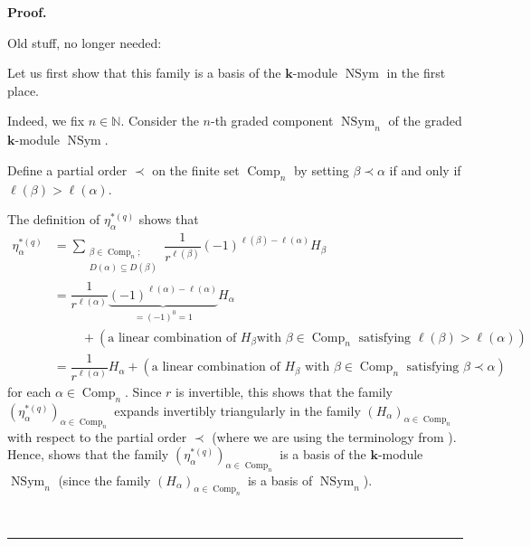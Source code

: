 \documentclass[numbers=enddot,12pt,final,onecolumn,notitlepage]{scrartcl}%
\theoremstyle{definition}
\newenvironment{proof}[1][Proof]{\noindent\textbf{#1.} }{\ \rule{0.5em}{0.5em}}
\let\sumnonlimits\sum
\renewcommand{\sum}{\sumnonlimits\limits}
\newenvironment{verlong}{}{}
\newenvironment{noncompile}{}{}
\begin{document}
\begin{proof}
\begin{verlong}
\end{verlong}

\begin{noncompile}
Old stuff, no longer needed:

Let us first show that this family is a basis of the $\mathbf{k}$-module
$\operatorname*{NSym}$ in the first place.

Indeed, we fix $n\in\mathbb{N}$. Consider the $n$-th graded component
$\operatorname*{NSym}\nolimits_{n}$ of the graded $\mathbf{k}$-module
$\operatorname*{NSym}$.

Define a partial order $\prec$ on the finite set $\operatorname*{Comp}%
\nolimits_{n}$ by setting $\beta\prec\alpha$ if and only if $\ell\left(
\beta\right)  >\ell\left(  \alpha\right)  $.

The definition of $\eta_{\alpha}^{\ast\left(  q\right)  }$ shows that%
\begin{align*}
\eta_{\alpha}^{\ast\left(  q\right)  }  &  =\sum_{\substack{\beta
\in\operatorname*{Comp}\nolimits_{n};\\D\left(  \alpha\right)  \subseteq
D\left(  \beta\right)  }}\dfrac{1}{r^{\ell\left(  \beta\right)  }}\left(
-1\right)  ^{\ell\left(  \beta\right)  -\ell\left(  \alpha\right)  }H_{\beta
}\\
&  =\dfrac{1}{r^{\ell\left(  \alpha\right)  }}\underbrace{\left(  -1\right)
^{\ell\left(  \alpha\right)  -\ell\left(  \alpha\right)  }}_{=\left(
-1\right)  ^{0}=1}H_{\alpha}\\
&  \ \ \ \ \ \ \ \ \ \ +\left(  \text{a linear combination of }H_{\beta}\text{
with }\beta\in\operatorname*{Comp}\nolimits_{n}\text{ satisfying }\ell\left(
\beta\right)  >\ell\left(  \alpha\right)  \right) \\
&  =\dfrac{1}{r^{\ell\left(  \alpha\right)  }}H_{\alpha}+\left(  \text{a
linear combination of }H_{\beta}\text{ with }\beta\in\operatorname*{Comp}%
\nolimits_{n}\text{ satisfying }\beta\prec\alpha\right)
\end{align*}
for each $\alpha\in\operatorname*{Comp}\nolimits_{n}$. Since $r$ is
invertible, this shows that the family $\left(  \eta_{\alpha}^{\ast\left(
q\right)  }\right)  _{\alpha\in\operatorname*{Comp}\nolimits_{n}}$ expands
invertibly triangularly in the family $\left(  H_{\alpha}\right)  _{\alpha
\in\operatorname*{Comp}\nolimits_{n}}$ with respect to the partial order
$\prec$ (where we are using the terminology from \cite[\S 11.1]{GriRei}).
Hence, \cite[Corollary 11.1.19(e)]{GriRei} shows that the family $\left(
\eta_{\alpha}^{\ast\left(  q\right)  }\right)  _{\alpha\in\operatorname*{Comp}%
\nolimits_{n}}$ is a basis of the $\mathbf{k}$-module $\operatorname*{NSym}%
\nolimits_{n}$ (since the family $\left(  H_{\alpha}\right)  _{\alpha
\in\operatorname*{Comp}\nolimits_{n}}$ is a basis of $\operatorname*{NSym}%
\nolimits_{n}$).


\end{noncompile}
\end{proof}
\end{document}
